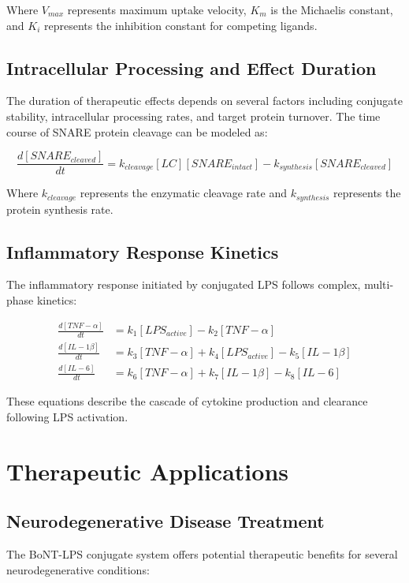 \documentclass[11pt,a4paper]{article}
\begin{document}
Where $V_{max}$ represents maximum uptake velocity, $K_m$ is the Michaelis constant, and $K_i$ represents the inhibition constant for competing ligands.

\subsection{Intracellular Processing and Effect Duration}

The duration of therapeutic effects depends on several factors including conjugate stability, intracellular processing rates, and target protein turnover. The time course of SNARE protein cleavage can be modeled as:

\begin{equation}
\frac{d[SNARE_{cleaved}]}{dt} = k_{cleavage}[LC][SNARE_{intact}] - k_{synthesis}[SNARE_{cleaved}]
\end{equation}

Where $k_{cleavage}$ represents the enzymatic cleavage rate and $k_{synthesis}$ represents the protein synthesis rate.

\subsection{Inflammatory Response Kinetics}

The inflammatory response initiated by conjugated LPS follows complex, multi-phase kinetics:

\begin{align}
\frac{d[TNF-\alpha]}{dt} &= k_1[LPS_{active}] - k_2[TNF-\alpha] \\
\frac{d[IL-1\beta]}{dt} &= k_3[TNF-\alpha] + k_4[LPS_{active}] - k_5[IL-1\beta] \\
\frac{d[IL-6]}{dt} &= k_6[TNF-\alpha] + k_7[IL-1\beta] - k_8[IL-6]
\end{align}

These equations describe the cascade of cytokine production and clearance following LPS activation.

\section{Therapeutic Applications}

\subsection{Neurodegenerative Disease Treatment}

The BoNT-LPS conjugate system offers potential therapeutic benefits for several neurodegenerative conditions:
\end{document}
